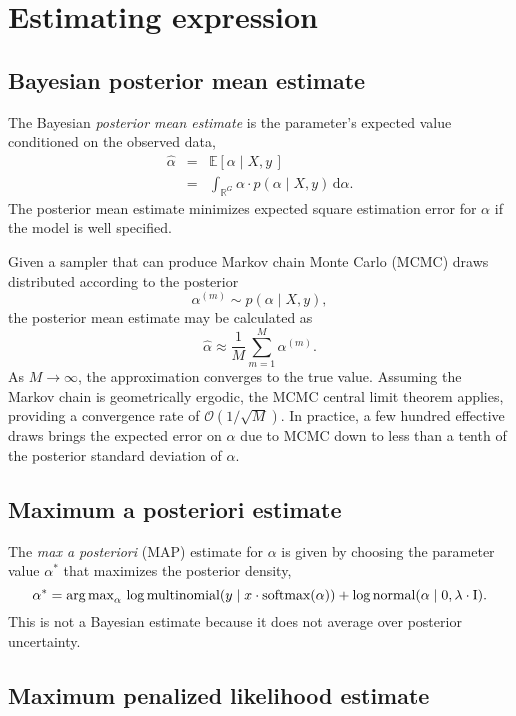 \documentclass[11pt]{article}
\begin{document}
\section{Estimating expression}

\subsection{Bayesian posterior mean estimate}

The Bayesian \emph{posterior mean estimate} is the parameter's
expected value conditioned on the observed data,
\begin{eqnarray*}
  \widehat{\alpha}
  & = & \mathbb{E}\!\left[\alpha \mid X, y \, \right]
  \\[6pt]
  & = & \int_{\mathbb{R}^G} \alpha \cdot p(\alpha \mid X, y) \, \textrm{d}\alpha.
\end{eqnarray*}
The posterior mean estimate minimizes expected square estimation error
for $\alpha$ if the model is well specified.

Given a sampler that can produce Markov chain Monte Carlo (MCMC) draws
distributed according to the posterior
\[
  \alpha^{(m)} \sim p(\alpha \mid X, y),
\]
the posterior mean estimate may be calculated as
\[
  \widehat{\alpha} \approx \frac{1}{M} \sum_{m = 1}^M \alpha^{(m)}.
\]
As $M \rightarrow \infty$, the approximation converges to the true
value.  Assuming the Markov chain is geometrically ergodic, the MCMC
central limit theorem applies, providing a convergence rate of
$\mathcal{O}\left(1 / \sqrt{M}\right)$.  In practice, a few hundred
effective draws brings the expected error on $\widehat{\alpha}$ due to
MCMC down to less than a tenth of the posterior standard deviation of
$\alpha$.

\subsection{Maximum a posteriori estimate}

The \emph{max a posteriori} (MAP) estimate for $\alpha$ is given by
choosing the parameter value $\alpha^*$ that maximizes the posterior
density,
\[
  \alpha^* = \textrm{arg\,max}_{\alpha} \,
  \log \textrm{multinomial}(y \mid x \cdot \textrm{softmax}(\alpha))
  + \log \textrm{normal}(\alpha \mid 0, \lambda \cdot \textrm{I}).
\]
This is not a Bayesian estimate because it does not average over
posterior uncertainty.


\subsection{Maximum penalized likelihood estimate}
\end{document}
